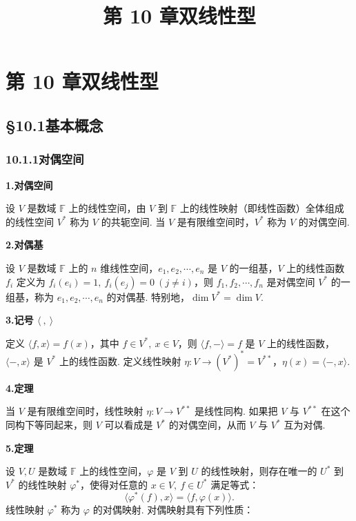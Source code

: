 \documentclass[UTF8,12pt,a4paper,fontset=fandol]{ctexart}
\title{第 10 章\quad 双线性型}
\author{}
\date{}
\begin{document}
\maketitle

\section*{第 10 章\quad 双线性型}

\subsection*{§10.1\quad 基本概念}

\subsubsection*{10.1.1\quad 对偶空间}

\noindent\textbf{1.\quad 对偶空间}

设 $V$ 是数域 $\mathbb{F}$ 上的线性空间，由 $V$ 到 $\mathbb{F}$ 上的线性映射（即线性函数）全体组成的线性空间 $V^*$ 称为 $V$ 的共轭空间. 当 $V$ 是有限维空间时，$V^*$ 称为 $V$ 的对偶空间.

\noindent\textbf{2.\quad 对偶基}

设 $V$ 是数域 $\mathbb{F}$ 上的 $n$ 维线性空间，$e_1,e_2,\cdots,e_n$ 是 $V$ 的一组基，$V$ 上的线性函数 $f_i$ 定义为 $f_i(e_i)=1,\ f_i(e_j)=0\ (j\ne i)$，则 $f_1,f_2,\cdots,f_n$ 是对偶空间 $V^*$ 的一组基，称为 $e_1,e_2,\cdots,e_n$ 的对偶基. 特别地，$\dim V^*=\dim V$.

\noindent\textbf{3.\quad 记号 $\langle\ ,\ \rangle$}

定义 $\langle f,x\rangle=f(x)$，其中 $f\in V^*,\ x\in V$，则 $\langle f,-\rangle=f$ 是 $V$ 上的线性函数，$\langle -,x\rangle$ 是 $V^*$ 上的线性函数. 定义线性映射 $\eta:V\to (V^*)^*=V^{**}$，$\eta(x)=\langle -,x\rangle$.

\noindent\textbf{4.\quad 定理}

当 $V$ 是有限维空间时，线性映射 $\eta:V\to V^{**}$ 是线性同构. 如果把 $V$ 与 $V^{**}$ 在这个同构下等同起来，则 $V$ 可以看成是 $V^*$ 的对偶空间，从而 $V$ 与 $V^*$ 互为对偶.

\noindent\textbf{5.\quad 定理}

设 $V,U$ 是数域 $\mathbb{F}$ 上的线性空间，$\varphi$ 是 $V$ 到 $U$ 的线性映射，则存在唯一的 $U^*$ 到 $V^*$ 的线性映射 $\varphi^*$，使得对任意的 $x\in V,\ f\in U^*$ 满足等式：
\begin{equation}
\langle \varphi^*(f),x\rangle=\langle f,\varphi(x)\rangle .
\tag{10.1}
\end{equation}
线性映射 $\varphi^*$ 称为 $\varphi$ 的对偶映射. 对偶映射具有下列性质：
\end{document}
